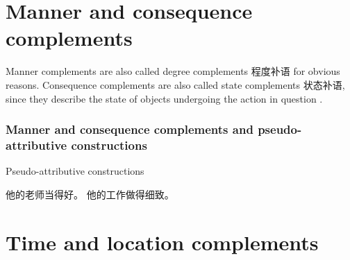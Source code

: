 \documentclass[../main.tex]{subfiles}
\begin{document}
\section{Manner and consequence complements}\label{sec:manner-consequence-complement}

Manner complements are also called degree complements 程度补语 for obvious reasons.
Consequence complements are also called state complements 状态补语, since they describe the state of 
objects undergoing the action in question \citep[]{xianhan2004}.

\subsubsection{Manner and consequence complements and pseudo-attributive constructions}

\begin{exe}
    \ex Pseudo-attributive constructions 
    \begin{xlist}
        \ex 他的老师当得好。
        \ex 他的工作做得细致。
    \end{xlist}
\end{exe}
\citep{huang2008}

\section{Time and location complements}\label{sec:location-complement}
\end{document}
